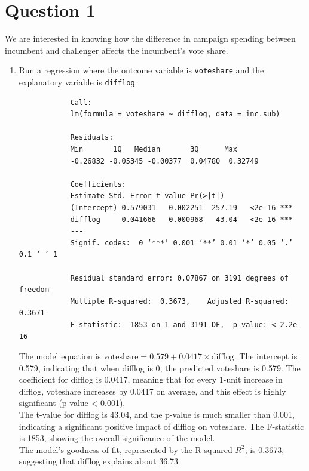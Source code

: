 \documentclass[12pt,letterpaper]{article}
\begin{document}
\section*{Question 1}
\vspace{.25cm}
\noindent We are interested in knowing how the difference in campaign spending between incumbent and challenger affects the incumbent's vote share. 
	\begin{enumerate}
		\item Run a regression where the outcome variable is \texttt{voteshare} and the explanatory variable is \texttt{difflog}.	
			 
				\begin{verbatim}
			Call:
			lm(formula = voteshare ~ difflog, data = inc.sub)
			
			Residuals:
			Min       1Q   Median       3Q      Max 
			-0.26832 -0.05345 -0.00377  0.04780  0.32749 
			
			Coefficients:
			Estimate Std. Error t value Pr(>|t|)    
			(Intercept) 0.579031   0.002251  257.19   <2e-16 ***
			difflog     0.041666   0.000968   43.04   <2e-16 ***
			---
			Signif. codes:  0 ‘***’ 0.001 ‘**’ 0.01 ‘*’ 0.05 ‘.’ 0.1 ‘ ’ 1
			
			Residual standard error: 0.07867 on 3191 degrees of freedom
			Multiple R-squared:  0.3673,	Adjusted R-squared:  0.3671 
			F-statistic:  1853 on 1 and 3191 DF,  p-value: < 2.2e-16
			\end{verbatim}  
		 
		
		
		The model equation is \( \text{voteshare} = 0.579 + 0.0417 \times \text{difflog} \). The intercept is 0.579, indicating that when difflog is 0, the predicted voteshare is 0.579. The coefficient for difflog is 0.0417, meaning that for every 1-unit increase in difflog, voteshare increases by 0.0417 on average, and this effect is highly significant (p-value < 0.001).\\
		
		The t-value for difflog is 43.04, and the p-value is much smaller than 0.001, indicating a significant positive impact of difflog on voteshare. The F-statistic is 1853, showing the overall significance of the model.\\
		
		The model’s goodness of fit, represented by the R-squared \( R^2 \), is 0.3673, suggesting that difflog explains about 36.73%
		

\end{enumerate}
\end{document}

